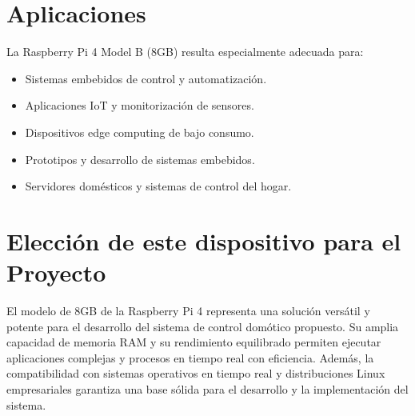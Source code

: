 \section{Aplicaciones}
    La Raspberry Pi 4 Model B (8GB) resulta especialmente adecuada para:
    \begin{itemize}
        \item Sistemas embebidos de control y automatización.
        \item Aplicaciones IoT y monitorización de sensores.
        \item Dispositivos edge computing de bajo consumo.
        \item Prototipos y desarrollo de sistemas embebidos.
        \item Servidores domésticos y sistemas de control del hogar.
    \end{itemize}

\section{Elección de este dispositivo para el Proyecto}
    El modelo de 8GB de la Raspberry Pi 4 representa una solución versátil y potente para el desarrollo del sistema de control domótico propuesto. Su amplia capacidad de memoria RAM y su rendimiento equilibrado permiten ejecutar aplicaciones complejas y procesos en tiempo real con eficiencia. Además, la compatibilidad con sistemas operativos en tiempo real y distribuciones Linux empresariales garantiza una base sólida para el desarrollo y la implementación del sistema.